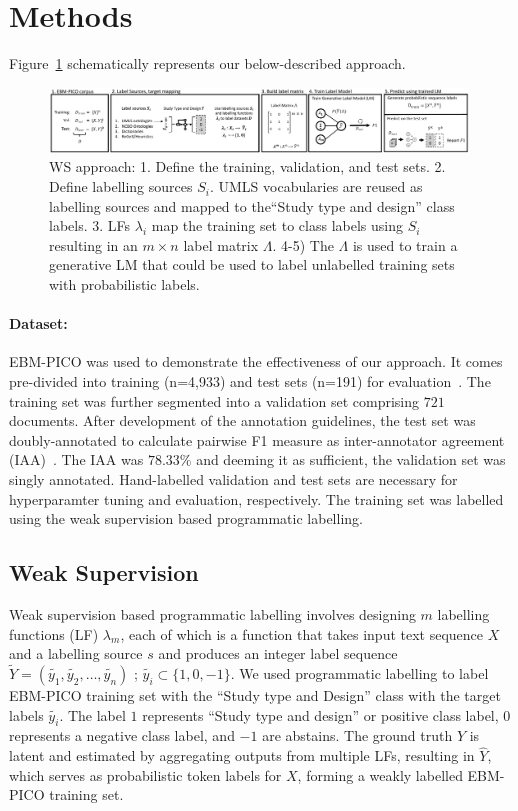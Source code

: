 \documentclass{IOS-Book-Article}
\begin{document}
\section{Methods}
\label{sec:methods}
%
Figure~\ref{fig:approach} schematically represents our below-described approach.
%
%
%
\begin{figure}[htb]
\centering
\includegraphics[width=0.99\textwidth]{Figures/approach.pdf}
\caption{WS approach: 1. Define the training, validation, and test sets. 2. Define labelling sources $S_{i}$. UMLS vocabularies are reused as labelling sources and mapped to the``Study type and design'' class labels. 3. LFs $\lambda_{i}$ map the training set to class labels using $S_{i}$ resulting in an $m \times n$ label matrix $\Lambda$. 4-5) The $\Lambda$ is used to train a generative LM that could be used to label unlabelled training sets with probabilistic labels.}
\label{fig:approach}
\end{figure}
%
%
%

\paragraph{Dataset:} 
%
EBM-PICO was used to demonstrate the effectiveness of our approach.
It comes pre-divided into training (n=4,933) and test sets (n=191) for evaluation~\cite{nye2018corpus}.
The training set was further segmented into a validation set comprising $721$ documents.%
After development of the annotation guidelines, the test set was doubly-annotated to calculate pairwise F1 measure as inter-annotator agreement (IAA)~\cite{deleger2012building}.
The IAA was $78.33\%$ and deeming it as sufficient, the validation set was singly annotated.
Hand-labelled validation and test sets are necessary for hyperparamter tuning and evaluation, respectively.
The training set was labelled using the weak supervision based programmatic labelling.
%
%
%
\subsection{Weak Supervision}
%
Weak supervision based programmatic labelling involves designing $m$ labelling functions (LF) $\lambda_{m}$, each of which is a function that takes input text sequence $X$ and a labelling source $s$ and produces an integer label sequence $\widetilde{Y} = (\widetilde{y_{1}}, \widetilde{y_{2}}, \ldots, \widetilde{y_{n}})$ ; $\widetilde{y_{i}} \subset \{1, 0, -1\}$.
We used programmatic labelling to label EBM-PICO training set with the ``Study type and Design'' class with the target labels $\widetilde{y_{i}}$.
The label $1$ represents ``Study type and design'' or positive class label, $0$ represents a negative class label, and $-1$ are abstains.
The ground truth $Y$ is latent and estimated by aggregating outputs from multiple LFs, resulting in $\hat{Y}$, which serves as probabilistic token labels for $X$, forming a weakly labelled EBM-PICO training set.
%
%
%
\end{document}
